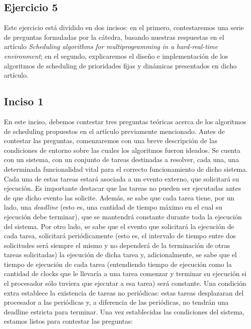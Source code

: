 \subsection{Ejercicio 5}
Este ejercicio est\'a dividido en dos incisos: en el primero, contestaremos una serie de preguntas formuladas por la c\'atedra, basando nuestras respuestas en el 
art\'iculo \textit{Scheduling algorithms for multiprogramming in a hard-real-time environment}; en el segundo, explicaremos el dise\~no e implementaci\'on 
de los algoritmos de scheduling de prioridades fijas y din\'amicas presentados en dicho art\'iculo.
\subsection*{Inciso 1}
En este inciso, debemos contestar tres preguntas te\'oricas acerca de los algoritmos de scheduling propuestos en el art\'iculo previamente mencionado. Antes de 
contestar las preguntas, comenzaremos con una breve descripci\'on de las condiciones de entorno sobre las cuales los algoritmos fueron ideados.
\newline
\newline
Se cuenta con un sistema, con un conjunto de tareas destinadas a resolver, cada una, una determinada funcionalidad vital para el correcto funcionamiento
de dicho sistema. Cada una de estas tareas estar\'a asociada a un evento externo, que solicitar\'a su ejecuci\'on. Es importante destacar que las tareas no
pueden ser ejecutadas antes de que dicho evento las solicite. Adem\'as, se sabe que cada tarea tiene, por un lado, una \textit{deadline} (esto es, una cantidad
de tiempo m\'aximo en el cual su ejecuci\'on debe terminar), que se mantendr\'a constante durante toda la ejecuci\'on del sistema. Por otro lado, se sabe
que el evento que solicitar\'a la ejecuci\'on de cada tarea, solicitar\'a peri\'odicamente (esto es, el intervalo de tiempo entre dos solicitudes ser\'a
siempre el mismo y no depender\'a de la terminaci\'on de otras tareas solicitadas) la ejecuci\'on de dicha tarea y, adicionalmente, se sabe que el tiempo de 
ejecuci\'on de cada tarea (entendiendo tiempo de ejecuci\'on como la cantidad de clocks que le llevar\'ia a una tarea comenzar y terminar su ejecuci\'on si el 
procesador s\'olo tuviera que ejecutar a esa tarea) ser\'a constante. Una condici\'on extra establece la existencia de tareas no peri\'odicas: estas tareas
desplazaran del procesador a las peri\'odicas y, a diferencia de las peri\'odicas, no tendr\'an una deadline estricta para terminar. Una vez establecidas
las condiciones del sistema, estamos listos para contestar las preguntas:
